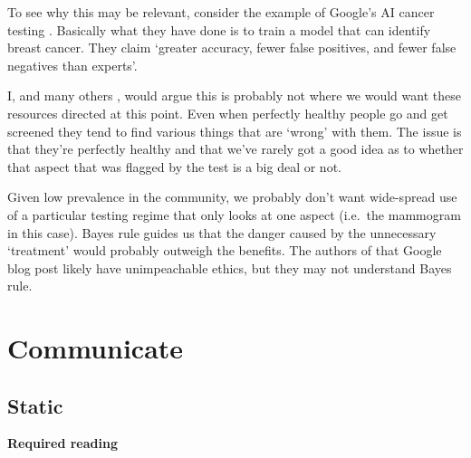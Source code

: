 \documentclass[
]{book}
\begin{document}
To see why this may be relevant, consider the example of Google's AI cancer testing \citep{citeGoogleAIbreastcancer}. Basically what they have done is to train a model that can identify breast cancer. They claim `greater accuracy, fewer false positives, and fewer false negatives than experts'.

I, and many others \citep{citeWiredonGoogle}, would argue this is probably not where we would want these resources directed at this point. Even when perfectly healthy people go and get screened they tend to find various things that are `wrong' with them. The issue is that they're perfectly healthy and that we've rarely got a good idea as to whether that aspect that was flagged by the test is a big deal or not.

Given low prevalence in the community, we probably don't want wide-spread use of a particular testing regime that only looks at one aspect (i.e.~the mammogram in this case). Bayes rule guides us that the danger caused by the unnecessary `treatment' would probably outweigh the benefits. The authors of that Google blog post likely have unimpeachable ethics, but they may not understand Bayes rule.

\hypertarget{part-communicate}{%
\part{Communicate}\label{part-communicate}}

\hypertarget{static}{%
\chapter{Static}\label{static}}

\textbf{Required reading}
\end{document}
